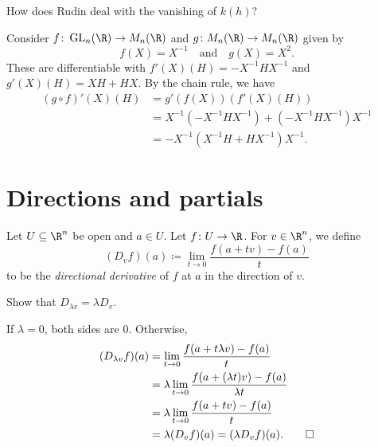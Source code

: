 How does Rudin deal with the vanishing of $k(h)$?
\begin{examples}
    \item Consider $f\colon \GL_n(\R) \to M_n(\R)$ and
    $g\colon M_n(\R) \to M_n(\R)$ given by \[
        f(X) = X^{-1} \quad \text{and} \quad g(X) = X^2.
    \] These are differentiable with $f'(X)(H) = -X^{-1}HX^{-1}$ and
    $g'(X)(H) = XH + HX$.
    By the chain rule, we have \begin{align*}
        (g \circ f)'(X)(H) &= g'(f(X))(f'(X)(H)) \\
        &= X^{-1}(-X^{-1}HX^{-1}) + (-X^{-1}HX^{-1})X^{-1} \\
        &= -X^{-1}(X^{-1}H + HX^{-1})X^{-1}.
    \end{align*} 
\end{examples}

\section{Directions and partials} \label{sec:pdv}

\begin{definition} \label{def:ddv}
    Let $U \subseteq \R^n$ be open and $a \in U$.
    Let $f\colon U \to \R$.
    For $v \in \R^n$, we define \[
        (D_v f)(a) \coloneq \lim_{t \to 0} \frac{f(a + tv) - f(a)}{t}
    \] to be the \emph{directional derivative} of $f$ at $a$
    in the direction of $v$.
\end{definition}

\begin{exercise}
    Show that $D_{\lambda v} = \lambda D_v$.
\end{exercise}
\begin{solution}
    If $\lambda = 0$, both sides are $0$.
    Otherwise, \begin{align*}
        (D_{\lambda v} f)(a)
            &= \lim_{t \to 0} \frac{f(a + t\lambda v) - f(a)}{t} \\
            &= \lambda \lim_{t \to 0} \frac{f(a + (\lambda t)v) - f(a)}
                                    {\lambda t} \\
            &= \lambda \lim_{t \to 0} \frac{f(a + tv) - f(a)}{t} \\
            &= \lambda (D_v f)(a) = (\lambda D_v f)(a). \qedhere
    \end{align*}
\end{solution}

